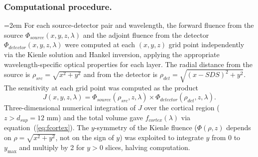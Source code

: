 \documentclass[11pt]{article}
\def\mathrm#1{#1}%
\def\,{ }%
\begin{document}
\subsubsection{Computational procedure.}
{\emergencystretch=2em For each source-detector pair and wavelength, the forward fluence from the source $\Phi_{\mathrm{source}}(x, y, z, \lambda)$ and the adjoint fluence from the detector $\Phi_{\mathrm{detector}}(x, y, z, \lambda)$ were computed at each $(x, y, z)$ grid point independently via the Kienle solution and Hankel inversion, applying the appropriate wavelength-specific optical properties for each layer. The radial distance from the source is $\rho_{\mathrm{src}} = \sqrt{x^2 + y^2}$ and from the detector is $\rho_{\mathrm{det}} = \sqrt{(x - \mathrm{SDS})^2 + y^2}$. The sensitivity at each grid point was computed as the product %
\begin{equation*}
J(x, y, z, \lambda) = \Phi_{\mathrm{source}}(\rho_{\mathrm{src}}, z, \lambda) \times \Phi_{\mathrm{detector}}(\rho_{\mathrm{det}}, z, \lambda).
\end{equation*}
%
\noindent Three-dimensional numerical integration of $J$ over the cortical region ($z > d_{\mathrm{sup}} = 12$\,mm) and the total volume gave $f_{\mathrm{cortex}}(\lambda)$ via equation~(\ref{eq:fcortex}). The $y$-symmetry of the Kienle fluence ($\Phi(\rho, z)$ depends on $\rho = \sqrt{x^2+y^2}$, not on the sign of $y$) was exploited to integrate $y$ from 0 to $y_{\max}$ and multiply by 2 for $y > 0$ slices, halving computation.}
\end{document}
